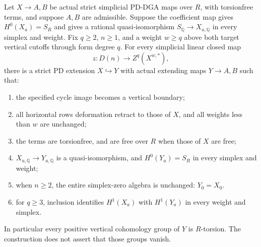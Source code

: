 \begin{theorem}
\label{AT14}
Let $X\to A,B$ be actual strict simplicial PD-DGA maps
over $R$, with torsionfree terms, and suppose $A,B$
are admissible.  Suppose the coefficient map gives
$H^0(X_a)=S_R$ and gives a rational quasi-isomorphism
$S_{\mathbb Q}\to X_{a,\mathbb Q}$ in every simplex
and weight.  Fix $q\geq2$, $n\geq1$, and a weight
$w\geq q$ above both target vertical cutoffs through
form degree $q$.
For every simplicial linear closed map
\[
                    z:D(n)\longrightarrow Z^q(X^{w,*}),
 \tag{AT.55}
\]
there is a strict PD extension $X\hookrightarrow Y$
with actual extending maps $Y\to A,B$ such that:
\begin{enumerate}
\item the specified cycle image becomes a vertical boundary;
\item all horizontal rows deformation retract to those of $X$,
      and all weights less than $w$ are unchanged;
\item the terms are torsionfree, and are free over $R$
      when those of $X$ are free;
\item $X_{a,\mathbb Q}\to Y_{a,\mathbb Q}$ is a
      quasi-isomorphism, and $H^0(Y_a)=S_R$ in every
      simplex and weight;
\item when $n\geq2$, the entire simplex-zero algebra is
      unchanged: $Y_0=X_0$.
\item for $q\geq3$, inclusion identifies $H^1(X_a)$
      with $H^1(Y_a)$ in every weight and simplex.
\end{enumerate}
In particular every positive vertical cohomology
group of $Y$ is $R$-torsion.  The construction does
not assert that those groups vanish.
\end{theorem}

